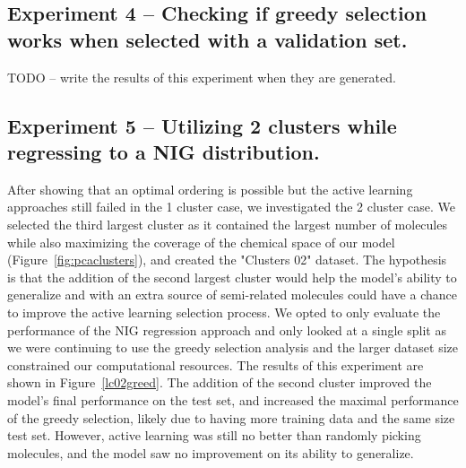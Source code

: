 \documentclass[journal=jmcmar,manuscript=article]{achemso}
\begin{document}
\subsection{Experiment 4 -- Checking if greedy selection works when selected with a validation set.}

TODO -- write the results of this experiment when they are generated.

\subsection{Experiment 5 -- Utilizing 2 clusters while regressing to a NIG distribution.}

After showing that an optimal ordering is possible but the active learning approaches still failed in the 1 cluster case, we investigated the 2 cluster case. We selected the third largest cluster as it contained the largest number of molecules while also maximizing the coverage of the chemical space of our model (Figure~\ref{fig:pcaclusters}), and created the "Clusters 02" dataset. The hypothesis is that the addition of the second largest cluster would help the model's ability to generalize and with an extra source of semi-related molecules could have a chance to improve the active learning selection process. We opted to only evaluate the performance of the NIG regression approach and only looked at a single split as we were continuing to use the greedy selection analysis and the larger dataset size constrained our computational resources. The results of this experiment are shown in Figure~\ref{lc02greed}. The addition of the second cluster improved the model's final performance on the test set, and increased the maximal performance of the greedy selection, likely due to having more training data and the same size test set. However, active learning was still no better than randomly picking molecules, and the model saw no improvement on its ability to generalize.
\end{document}
